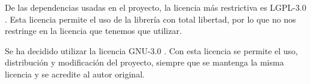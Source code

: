 De las dependencias usadas en el proyecto, la licencia más restrictiva es LGPL-3.0 \cite{misc:lgpl}. Esta licencia permite el uso de la librería con total libertad, por lo que no nos restringe en la licencia que tenemos que utilizar.

Se ha decidido utilizar la licencia GNU-3.0 \cite{misc:gnu3}. Con esta licencia se permite el uso, distribución y modificación del proyecto, siempre que se mantenga la misma licencia y se acredite al autor original.
